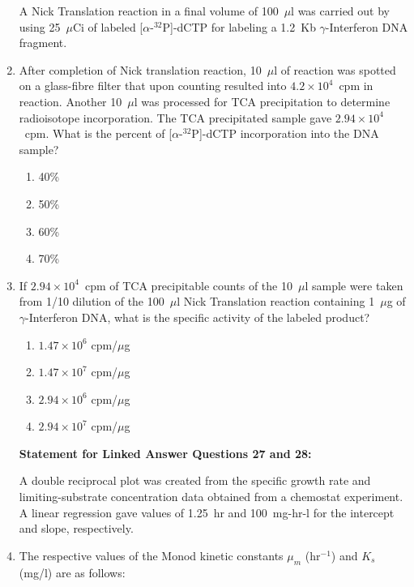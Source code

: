 \documentclass[journal,12pt,onecolumn]{IEEEtran}
\begin{document}
\begin{enumerate}
A Nick Translation reaction in a final volume of 100~$\mu$l was carried out by using 25~$\mu$Ci of labeled [$\alpha$-$^{32}$P]-dCTP for labeling a 1.2~Kb $\gamma$-Interferon DNA fragment.

\item After completion of Nick translation reaction, 10~$\mu$l of reaction was spotted on a glass-fibre filter that upon counting resulted into $4.2 \times 10^4$~cpm in reaction. Another 10~$\mu$l was processed for TCA precipitation to determine radioisotope incorporation. The TCA precipitated sample gave $2.94 \times 10^4$~cpm. What is the percent of [$\alpha$-$^{32}$P]-dCTP incorporation into the DNA sample?

\begin{multicols}{2}
\begin{enumerate}[label=(\Alph*)]
    \item 40\%
    \item 50\%
    \item 60\%
    \item 70\%
\end{enumerate}
\end{multicols}

\item If $2.94 \times 10^4$~cpm of TCA precipitable counts of the 10~$\mu$l sample were taken from 1/10 dilution of the 100~$\mu$l Nick Translation reaction containing 1~$\mu$g of $\gamma$-Interferon DNA, what is the specific activity of the labeled product?

\begin{multicols}{2}
\begin{enumerate}[label=(\Alph*)]
    \item $1.47 \times 10^{6}$ cpm/$\mu$g
    \item $1.47 \times 10^{7}$ cpm/$\mu$g
    \item $2.94 \times 10^{6}$ cpm/$\mu$g
    \item $2.94 \times 10^{7}$ cpm/$\mu$g
\end{enumerate}
\end{multicols}

\noindent\textbf{Statement for Linked Answer Questions 27 and 28:}  

A double reciprocal plot was created from the specific growth rate and limiting-substrate concentration data obtained from a chemostat experiment. A linear regression gave values of 1.25~hr and 100~mg-hr-l for the intercept and slope, respectively.

\item The respective values of the Monod kinetic constants $\mu_m$ (hr$^{-1}$) and $K_s$ (mg/l) are as follows:


\end{enumerate}
\end{document}
